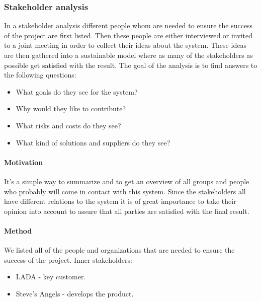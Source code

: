 \documentclass[10pt]{article}
\begin{document}
\subsubsection{Stakeholder analysis}
In a stakeholder analysis different people whom are needed to ensure the success of the project are first listed. Then these people are either interviewed or invited to a joint meeting in order to collect their ideas about the system. These ideas are then gathered into a sustainable model where as many of the stakeholders as possible get satisfied with the result. The goal of the analysis is to find answers to the following questions:
\begin{itemize}
\item What goals do they see for the system?
\item Why would they like to contribute?
\item What risks and costs do they see?
\item What kind of solutions and suppliers do they see?
\end{itemize}

\paragraph[5pt]{Motivation}
\hfill \break
It’s a simple way to summarize and to get an overview of all groups and people who probably will come in contact with this system. Since the stakeholders all have different relations to the system it is of great importance to take their opinion into account to assure that all parties are satisfied with the final result.
\paragraph{Method}
\hfill \break
We listed all of the people and organizations that are needed to ensure the success of the project. 
Inner stakeholders:
\begin{itemize}
\item LADA - key customer. 
\item Steve's Angels - develops the product. 
\end{itemize}
\end{document}
